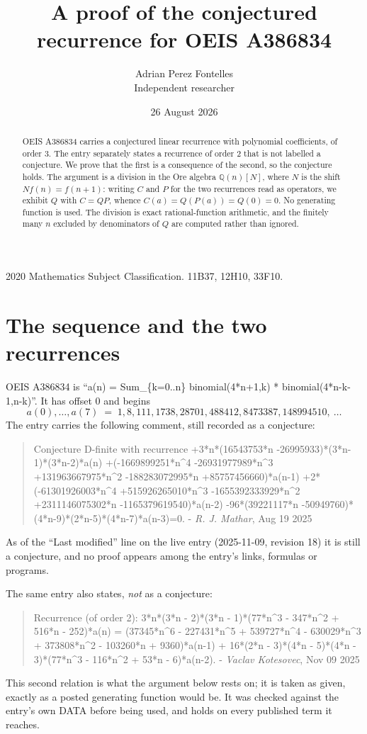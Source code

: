 \documentclass[11pt,a4paper]{article}
\title{A proof of the conjectured recurrence for OEIS A386834}
\author{Adrian Perez Fontelles\\ \small Independent researcher}
\date{26 August 2026}
\theoremstyle{plain}
\theoremstyle{definition}
\begin{document}
\maketitle

\begin{abstract}
OEIS A386834 carries a conjectured linear recurrence with polynomial coefficients, of
order 3. The entry separately states a recurrence of order 2 that is not
labelled a conjecture. We prove that the first is a consequence of the second, so the
conjecture holds. The argument is a division in the Ore algebra
$\mathbb{Q}(n)[N]$, where $N$ is the shift $Nf(n)=f(n+1)$: writing $C$ and $P$ for the two
recurrences read as operators, we exhibit $Q$ with $C=QP$, whence
$C(a)=Q(P(a))=Q(0)=0$. No generating function is used. The division is exact
rational-function arithmetic, and the finitely many $n$ excluded by denominators of $Q$
are computed rather than ignored.
\end{abstract}

\noindent\small 2020 Mathematics Subject Classification. 11B37, 12H10, 33F10.\normalsize

\section{The sequence and the two recurrences}

OEIS A386834 is ``a(n) = Sum\_\{k=0..n\} binomial(4*n+1,k) * binomial(4*n-k-1,n-k)''. It has offset $0$ and begins
\[
a(0),\dots,a(7)\;=\;1, 8, 111, 1738, 28701, 488412, 8473387, 148994510,\ \dots
\]
The entry carries the following comment, still recorded as a conjecture:
\begin{quote}\small
Conjecture D-finite with recurrence +3*n*(16543753*n -26995933)*(3*n-1)*(3*n-2)*a(n) +(-1669899251*n\^{}4 -26931977989*n\^{}3 +131963667975*n\^{}2 -188283072995*n +85757456660)*a(n-1) +2*(-61301926003*n\^{}4 +515926265010*n\^{}3 -1655392333929*n\^{}2 +2311146075302*n -1165379619540)*a(n-2) -96*(39221117*n -50949760)*(4*n-9)*(2*n-5)*(4*n-7)*a(n-3)=0. - \emph{R. J. Mathar}, Aug 19 2025
\end{quote}
As of the ``Last modified'' line on the live entry (2025-11-09, revision 18) it is still
a conjecture, and no proof appears among the entry's links, formulas or programs.

The same entry also states, \emph{not} as a conjecture:
\begin{quote}\small
Recurrence (of order 2): 3*n*(3*n - 2)*(3*n - 1)*(77*n\^{}3 - 347*n\^{}2 + 516*n - 252)*a(n) = (37345*n\^{}6 - 227431*n\^{}5 + 539727*n\^{}4 - 630029*n\^{}3 + 373808*n\^{}2 - 103260*n + 9360)*a(n-1) + 16*(2*n - 3)*(4*n - 5)*(4*n - 3)*(77*n\^{}3 - 116*n\^{}2 + 53*n - 6)*a(n-2). - \emph{Vaclav Kotesovec}, Nov 09 2025
\end{quote}
This second relation is what the argument below rests on; it is taken as given, exactly as
a posted generating function would be. It was checked against the entry's own DATA before
being used, and holds on every published term it reaches.
\end{document}
